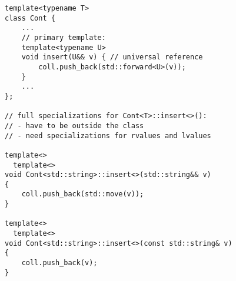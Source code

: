 \begin{lstlisting}[caption={}]
template<typename T>
class Cont {
	...
	// primary template:
	template<typename U>
	void insert(U&& v) { // universal reference
		coll.push_back(std::forward<U>(v));
	}
	...
};

// full specializations for Cont<T>::insert<>():
// - have to be outside the class
// - need specializations for rvalues and lvalues

template<>
  template<>
void Cont<std::string>::insert<>(std::string&& v)
{
	coll.push_back(std::move(v));
}

template<>
  template<>
void Cont<std::string>::insert<>(const std::string& v)
{
	coll.push_back(v);
}
\end{lstlisting}

















































